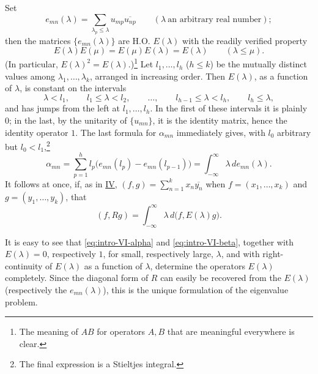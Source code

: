﻿\documentclass[paper=b5,fontsize=13pt,bookmarkpackage=false,twoside]{scrartcl}
\begin{document}
Set
\[
 e_{mn}(\lambda)
 =\sum_{\lambda_p\le\lambda}u_{mp}\overline{u_{np}}
 \qquad(\lambda\ \text{an arbitrary real number});
\]
then the matrices $\{e_{mn}(\lambda)\}$ are H.O. $E(\lambda)$ with the readily verified property
\begin{equation}
 E(\lambda)E(\mu)=E(\mu)E(\lambda)=E(\lambda)
 \qquad(\lambda\le\mu).
 \tag{$\alpha$}\label{eq:intro-VI-alpha}
\end{equation}
(In particular, $E(\lambda)^2=E(\lambda)$.)\footnote{\label{fn:source-14}The meaning of $AB$ for operators $A,B$ that are meaningful everywhere is clear.} Let $l_1,\ldots,l_h$ ($h\le k$) be the mutually distinct values among $\lambda_1,\ldots,\lambda_k$, arranged in increasing order. Then $E(\lambda)$, as a function of $\lambda$, is constant on the intervals
\[
 \lambda<l_1,\qquad
 l_1\le\lambda<l_2,\qquad\ldots,\qquad
 l_{h-1}\le\lambda<l_h,\qquad
 l_h\le\lambda,
\]
and has jumps from the left at $l_1,\ldots,l_h$. In the first of these intervals it is plainly $0$; in the last, by the unitarity of $\{u_{mn}\}$, it is the identity matrix, hence the identity operator $1$. The last formula for $\alpha_{mn}$ immediately gives, with $l_0$ arbitrary but $l_0<l_1$,\footnote{\label{fn:source-15}The final expression is a Stieltjes integral.}
\[
 \alpha_{mn}
 =\sum_{p=1}^{h}l_p\bigl(e_{mn}(l_p)-e_{mn}(l_{p-1})\bigr)
 =\int_{-\infty}^{\infty}\lambda\,de_{mn}(\lambda).
\]
It follows at once, if, as in \hyperref[intro:IV]{IV}, $(f,g)=\sum_{n=1}^{k}x_n\overline{y_n}$ when $f=(x_1,\ldots,x_k)$ and $g=(y_1,\ldots,y_k)$, that
\begin{equation}
 (f,Rg)
 =\int_{-\infty}^{\infty}\lambda\,d\bigl(f,E(\lambda)g\bigr).
 \tag{$\beta$}\label{eq:intro-VI-beta}
\end{equation}

It is easy to see that \eqref{eq:intro-VI-alpha} and \eqref{eq:intro-VI-beta}, together with $E(\lambda)=0$, respectively $1$, for small, respectively large, $\lambda$, and with right-continuity of $E(\lambda)$ as a function of $\lambda$, determine the operators $E(\lambda)$ completely. Since the diagonal form of $R$ can easily be recovered from the $E(\lambda)$ (respectively the $e_{mn}(\lambda)$), this is the unique formulation of the eigenvalue problem.
\end{document}
